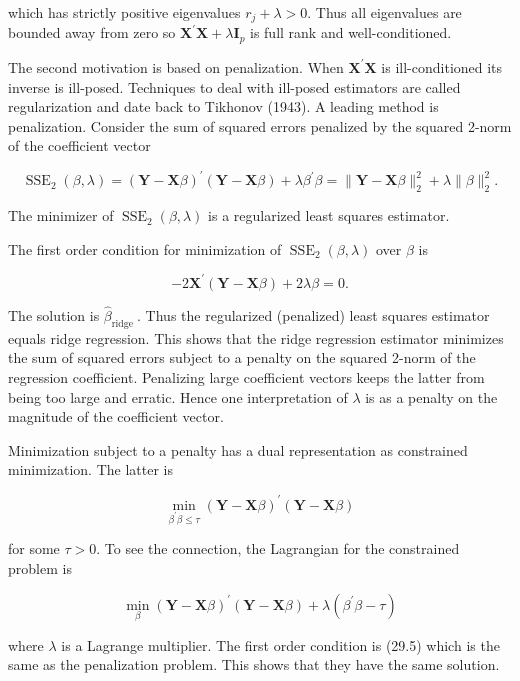 \documentclass[10pt]{article}
\begin{document}
which has strictly positive eigenvalues $r_{j}+\lambda>0$. Thus all eigenvalues are bounded away from zero so $\boldsymbol{X}^{\prime} \boldsymbol{X}+\lambda \boldsymbol{I}_{p}$ is full rank and well-conditioned.

The second motivation is based on penalization. When $\boldsymbol{X}^{\prime} \boldsymbol{X}$ is ill-conditioned its inverse is ill-posed. Techniques to deal with ill-posed estimators are called regularization and date back to Tikhonov (1943). A leading method is penalization. Consider the sum of squared errors penalized by the squared 2-norm of the coefficient vector

$$
\operatorname{SSE}_{2}(\beta, \lambda)=(\boldsymbol{Y}-\boldsymbol{X} \beta)^{\prime}(\boldsymbol{Y}-\boldsymbol{X} \beta)+\lambda \beta^{\prime} \beta=\|\boldsymbol{Y}-\boldsymbol{X} \beta\|_{2}^{2}+\lambda\|\beta\|_{2}^{2} .
$$

The minimizer of $\operatorname{SSE}_{2}(\beta, \lambda)$ is a regularized least squares estimator.

The first order condition for minimization of $\operatorname{SSE}_{2}(\beta, \lambda)$ over $\beta$ is

$$
-2 \boldsymbol{X}^{\prime}(\boldsymbol{Y}-\boldsymbol{X} \beta)+2 \lambda \beta=0 .
$$

The solution is $\widehat{\beta}_{\text {ridge }}$. Thus the regularized (penalized) least squares estimator equals ridge regression. This shows that the ridge regression estimator minimizes the sum of squared errors subject to a penalty on the squared 2-norm of the regression coefficient. Penalizing large coefficient vectors keeps the latter from being too large and erratic. Hence one interpretation of $\lambda$ is as a penalty on the magnitude of the coefficient vector.

Minimization subject to a penalty has a dual representation as constrained minimization. The latter is

$$
\min _{\beta^{\prime} \beta \leq \tau}(\boldsymbol{Y}-\boldsymbol{X} \beta)^{\prime}(\boldsymbol{Y}-\boldsymbol{X} \beta)
$$

for some $\tau>0$. To see the connection, the Lagrangian for the constrained problem is

$$
\min _{\beta}(\boldsymbol{Y}-\boldsymbol{X} \beta)^{\prime}(\boldsymbol{Y}-\boldsymbol{X} \beta)+\lambda\left(\beta^{\prime} \beta-\tau\right)
$$

where $\lambda$ is a Lagrange multiplier. The first order condition is (29.5) which is the same as the penalization problem. This shows that they have the same solution.
\end{document}
